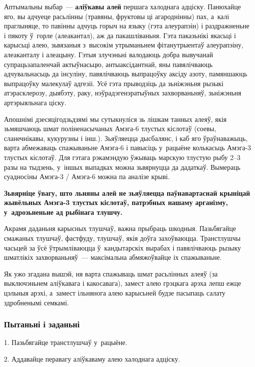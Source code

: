 Аптымальны выбар~--- \textbf{аліўкавы алей} першага халоднага адціску. Панюхайце яго, вы адчуеце расьлінны (травяны, фруктовы ці агароднінны) пах, а~калі праглыняце, то павінны адчуць горыч на языку (гэта алеурапэін) і раздражненьне і пякоту ў~горле (алеакантал), аж да пакашліваньня. Гэта паказьнікі якасьці і карысьці алею, зьвязаныя з~высокім утрыманьнем фітанутрыентаў алеурапэіну, алеаканталу і алеацыну. Гэтыя злучэньні валодаюць добра вывучанай супрацьзапаленчай актыўнасьцю, антыаксідантнай, яны павялічваюць адчувальнасьць да інсуліну, павялічваюць выпрацоўку аксіду азоту, памяншаюць выпрацоўку малекулаў адгезіі. Усё гэта прыводзіць да зьніжэньня рызыкі атэрасклерозу, дыябэту, раку, нэўрадэгенэратыўных захворваньняў, зьніжэньня артэрыяльнага ціску.

Апошнімі дзесяцігодзьдзямі мы сутыкнуліся зь лішкам танных алеяў, якія зьмяшчаюць шмат поліненасычаных Амэга-6 тлустых кіслотаў (соевы, сланечнікавы, кукурузны і інш.). Зьяўляецца дысбалянс, і каб яго ўраўнаважыць, варта абмежаваць спажываньне Амэга-6 і павысіць у~рацыёне колькасьць Амэга-3 тлустых кіслотаў. Для гэтага рэкамэндую ўжываць марскую тлустую рыбу 2--3 разы на тыдзень, у~іншых выпадках можна зьвярнуцца да дадаткаў. Вымераць суадносіны Амэга-3 / Амэга-6 можна па аналізе крыві. 

\textbf{Зьвярніце ўвагу, што льняны алей не зьяўляецца паўнавартаснай крыніцай жывёльных Амэга-3 тлустых кіслотаў, патрэбных нашаму арганізму, у~адрозьненьне ад рыбінага тлушчу.}

Акрамя даданьня карысных тлушчаў, важна прыбраць шкодныя. Пазьбягайце смажаных тлушчаў, фастфуду, тлушчаў, якія доўга захоўваюцца. Транстлушчы часьцей за ўсё ўтрымліваюцца ў~кандытарскіх вырабах і павялічваюць рызыку шматлікіх захворваньняў~--- максімальна абмяжоўвайце іх спажываньне. 

Як ужо згадана вышэй, ня варта спажываць шмат расьлінных алеяў (за выключэньнем аліўкавага і какосавага), замест алею грэцкага арэха лепш ежце цэльныя арэхі, а~замест ільнянога алею карысьней будзе пасыпаць салату здробненымі семкамі.

\subsubsection{Пытаньні і заданьні}

1. Пазьбягайце транстлушчаў у~рацыёне.

2. Аддавайце перавагу аліўкаваму алею халоднага адціску.

